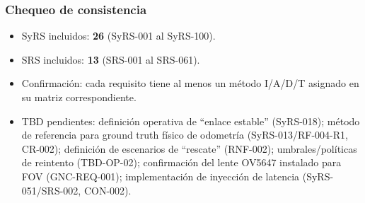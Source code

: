 \subsubsection*{Chequeo de consistencia}
\begin{itemize}
  \item SyRS incluidos: \textbf{26} (SyRS-001 al SyRS-100).
  \item SRS incluidos: \textbf{13} (SRS-001 al SRS-061).
  \item Confirmación: cada requisito tiene al menos un método I/A/D/T asignado en su matriz correspondiente.
  \item TBD pendientes: definición operativa de ``enlace estable'' (SyRS-018); método de referencia para ground truth físico de odometría (SyRS-013/RF-004-R1, CR-002); definición de escenarios de ``rescate'' (RNF-002); umbrales/políticas de reintento (TBD-OP-02); confirmación del lente OV5647 instalado para FOV (GNC-REQ-001); implementación de inyección de latencia (SyRS-051/SRS-002, CON-002).
\end{itemize}
